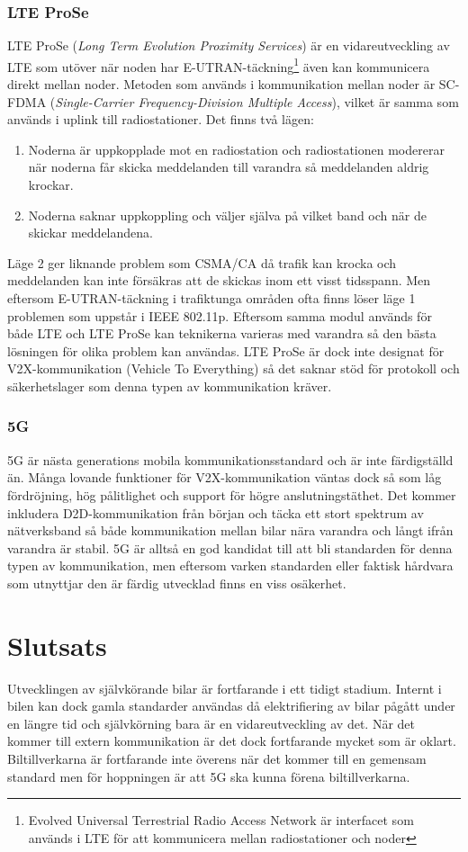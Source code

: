 \documentclass[a4paper]{IEEEtran}
\begin{document}
\subsubsection{LTE ProSe}
LTE ProSe (\emph{Long Term Evolution Proximity Services}) är en vidareutveckling av LTE som utöver när noden har E-UTRAN-täckning\footnote{Evolved Universal Terrestrial Radio Access Network är interfacet som används i LTE för att kommunicera mellan radiostationer och noder} även kan kommunicera direkt mellan noder.
Metoden som används i kommunikation mellan noder är SC-FDMA (\emph{Single-Carrier Frequency-Division Multiple Access}), vilket är samma som används i uplink till radiostationer. Det finns två lägen:
\begin{enumerate}
	\item Noderna är uppkopplade mot en radiostation och radiostationen modererar när noderna får skicka meddelanden till varandra så meddelanden aldrig krockar.
	\item Noderna saknar uppkoppling och väljer själva på vilket band och när de skickar meddelandena.
\end{enumerate}
Läge 2 ger liknande problem som CSMA/CA då trafik kan krocka och meddelanden kan inte försäkras att de skickas inom ett visst tidsspann.
Men eftersom E-UTRAN-täckning i trafiktunga områden ofta finns löser läge 1 problemen som uppstår i IEEE 802.11p.
Eftersom samma modul används för både LTE och LTE ProSe kan teknikerna varieras med varandra så den bästa lösningen för olika problem kan användas.
LTE ProSe är dock inte designat för V2X-kommunikation (Vehicle To Everything) så det saknar stöd för protokoll och säkerhetslager som denna typen av kommunikation kräver.
\subsubsection{5G}
5G är nästa generations mobila kommunikationsstandard och är inte färdigställd än. Många lovande funktioner för V2X-kommunikation väntas dock så som låg fördröjning, hög pålitlighet och support för högre anslutningstäthet.
Det kommer inkludera D2D-kommunikation från början och täcka ett stort spektrum av nätverksband så både kommunikation mellan bilar nära varandra och långt ifrån varandra är stabil.
5G är alltså en god kandidat till att bli standarden för denna typen av kommunikation, men eftersom varken standarden eller faktisk hårdvara som utnyttjar den är färdig utvecklad finns en viss osäkerhet.

\section{Slutsats}
Utvecklingen av självkörande bilar är fortfarande i ett tidigt stadium. Internt i bilen kan dock gamla standarder användas då elektrifiering av bilar pågått under en längre tid och självkörning bara är en vidareutveckling av det. När det kommer till extern kommunikation är det dock fortfarande mycket som är oklart. Biltillverkarna är fortfarande inte överens när det kommer till en gemensam standard men för hoppningen är att 5G ska kunna förena biltillverkarna.
\end{document}
